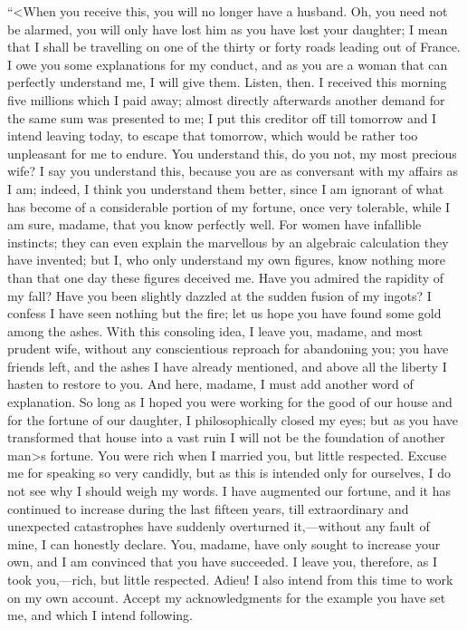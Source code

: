  “<When you receive this, you will no longer have a husband. Oh, you need not be alarmed, you will only have lost him as you have lost your daughter; I mean that I shall be travelling on one of the thirty or forty roads leading out of France. I owe you some explanations for my conduct, and as you are a woman that can perfectly understand me, I will give them. Listen, then. I received this morning five millions which I paid away; almost directly afterwards another demand for the same sum was presented to me; I put this creditor off till tomorrow and I intend leaving today, to escape that tomorrow, which would be rather too unpleasant for me to endure. You understand this, do you not, my most precious wife? I say you understand this, because you are as conversant with my affairs as I am; indeed, I think you understand them better, since I am ignorant of what has become of a considerable portion of my fortune, once very tolerable, while I am sure, madame, that you know perfectly well. For women have infallible instincts; they can even explain the marvellous by an algebraic calculation they have invented; but I, who only understand my own figures, know nothing more than that one day these figures deceived me. Have you admired the rapidity of my fall? Have you been slightly dazzled at the sudden fusion of my ingots? I confess I have seen nothing but the fire; let us hope you have found some gold among the ashes. With this consoling idea, I leave you, madame, and most prudent wife, without any conscientious reproach for abandoning you; you have friends left, and the ashes I have already mentioned, and above all the liberty I hasten to restore to you. And here, madame, I must add another word of explanation. So long as I hoped you were working for the good of our house and for the fortune of our daughter, I philosophically closed my eyes; but as you have transformed that house into a vast ruin I will not be the foundation of another man>s fortune. You were rich when I married you, but little respected. Excuse me for speaking so very candidly, but as this is intended only for ourselves, I do not see why I should weigh my words. I have augmented our fortune, and it has continued to increase during the last fifteen years, till extraordinary and unexpected catastrophes have suddenly overturned it,—without any fault of mine, I can honestly declare. You, madame, have only sought to increase your own, and I am convinced that you have succeeded. I leave you, therefore, as I took you,—rich, but little respected. Adieu! I also intend from this time to work on my own account. Accept my acknowledgments for the example you have set me, and which I intend following. 

